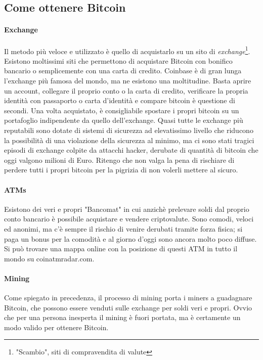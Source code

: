 \documentclass {article}
\begin{document}
\subsection {Come ottenere Bitcoin}


\paragraph {Exchange}


Il metodo più veloce e utilizzato è quello di acquistarlo su un sito di \textit{exchange}\footnote{"Scambio", siti di compravendita di valute}. Esistono moltissimi siti che permettono di acquistare Bitcoin con bonifico bancario o semplicemente con una carta di credito.
Coinbase è di gran lunga l'exchange più famosa del mondo, ma ne esistono una moltitudine.
Basta aprire un account, collegare il proprio conto o la carta di credito, verificare la propria identità con passaporto o carta d'identità e compare bitcoin è questione di secondi.
Una volta acquistato, è consigliabile spostare i propri bitcoin su un portafoglio indipendente da quello dell'exchange.
Quasi tutte le exchange più reputabili sono dotate di sistemi di sicurezza ad elevatissimo livello che riducono la possibilità di una violazione della sicurezza al minimo, ma ci sono stati tragici episodi di exchange colpite da attacchi hacker, derubate di quantità di bitcoin che oggi valgono milioni di Euro.
Ritengo che non valga la pena di rischiare di perdere tutti i propri bitcoin per la pigrizia di non volerli mettere al sicuro.

\paragraph {ATMs}

Esistono dei veri e propri "Bancomat" in cui anzichè prelevare soldi dal proprio conto bancario è possibile acquistare e vendere criptovalute.
Sono comodi, veloci ed anonimi, ma c'è sempre il rischio di venire derubati tramite forza fisica; si paga un bonus per la comodità e al giorno d'oggi sono ancora molto poco diffuse.
Si può trovare una mappa online con la posizione di questi ATM in tutto il mondo su coinatmradar.com.

\paragraph {Mining}

Come spiegato in precedenza, il processo di mining porta i miners a guadagnare Bitcoin, che possono essere venduti sulle exchange per soldi veri e propri.
Ovvio che per una persona inesperta il mining è fuori portata, ma è certamente un modo valido per ottenere Bitcoin.
\end{document}
